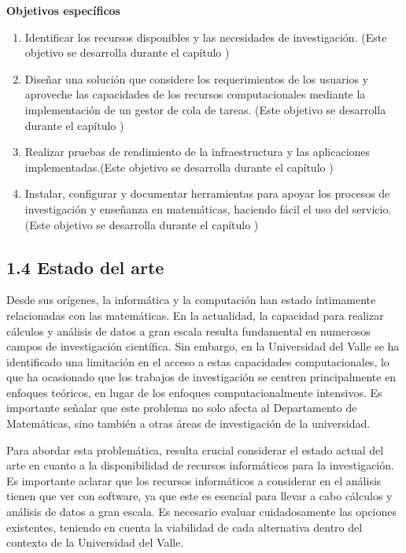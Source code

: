 \begin{spacing}{1.5}
  \textbf{Objetivos específicos}
  \begin{enumerate}
    \item Identificar los recursos disponibles y las necesidades de investigación. (Este objetivo se desarrolla durante el capítulo )
    \item Diseñar una solución que considere los requerimientos de los usuarios y aproveche las capacidades de los recursos computacionales mediante la implementación de un gestor de cola de tareas. (Este objetivo se desarrolla durante el capítulo )
    \item  Realizar pruebas de rendimiento de la infraestructura y las aplicaciones implementadas.(Este objetivo se desarrolla durante el capítulo ) 
    \item Instalar, configurar y documentar herramientas para apoyar los procesos de investigación y enseñanza en matemáticas, haciendo fácil el uso del servicio.(Este objetivo se desarrolla durante el capítulo )\newline
  \end{enumerate}

  \subsection{1.4 Estado del arte}

  Desde sus orígenes, la informática y la computación han estado íntimamente relacionadas con las matemáticas. En la actualidad, la capacidad para realizar cálculos y análisis de datos a gran escala resulta fundamental en numerosos campos de investigación científica. Sin embargo, en la Universidad del Valle se ha identificado una limitación en el acceso a estas capacidades computacionales, lo que ha ocasionado que los trabajos de investigación se centren principalmente en enfoques teóricos, en lugar de los enfoques computacionalmente intensivos. Es importante señalar que este problema no solo afecta al Departamento de Matemáticas, sino también a otras áreas de investigación de la universidad.

Para abordar esta problemática, resulta crucial considerar el estado actual del arte en cuanto a la disponibilidad de recursos informáticos para la investigación. Es importante aclarar que los recursos informáticos a considerar en el análisis tienen que ver con software, ya que este es esencial para llevar a cabo cálculos y análisis de datos a gran escala. Es necesario evaluar cuidadosamente las opciones existentes, teniendo en cuenta la viabilidad de cada alternativa dentro del contexto de la Universidad del Valle. 


\end{spacing}
